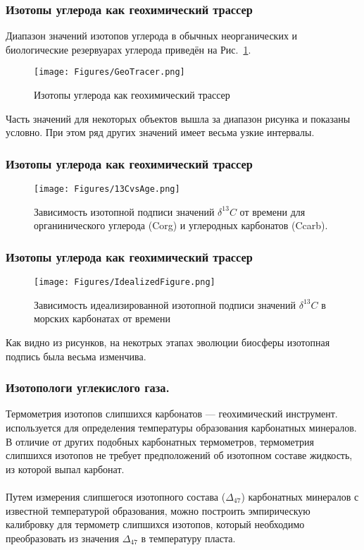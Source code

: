 \begin{frame}
\frametitle{Изотопы углерода как геохимический трассер}


Диапазон значений изотопов углерода в обычных неорганических и
биологические резервуарах углерода приведён на Рис.~\ref{fig:GeoTracer}.
\begin{figure}[h]
	\centering
	\texttt{[image: Figures/GeoTracer.png]}
	\caption{Изотопы углерода как геохимический трассер}
	\label{fig:GeoTracer}
\end{figure}
Часть значений для некоторых объектов вышла за диапазон рисунка и показаны условно. При этом ряд других значений имеет весьма узкие интервалы.

\end{frame}


\begin{frame}
\frametitle{Изотопы углерода как геохимический трассер}

\begin{figure}[h]
	\centering
	\texttt{[image: Figures/13CvsAge.png]}
	\caption{Зависимость изотопной подписи значений $\delta^{13}C$  от времени  для органинического углерода (Corg) и углеродных карбонатов (Ccarb).}
	\label{fig:13CvsAge}
\end{figure}


\end{frame}

\begin{frame}
\frametitle{Изотопы углерода как геохимический трассер}
\begin{figure}[h]
	\centering
	\texttt{[image: Figures/IdealizedFigure.png]}
	\caption{Зависимость идеализированной изотопной подписи значений $\delta^{13}C$ в морских карбонатах от времени}
	\label{fig:IdealizedFigure}
\end{figure}

Как видно из рисунков, на некотрых этапах эволюции биосферы изотопная подпись была весьма изменчива.
\end{frame}

\begin{frame}
\frametitle{Изотопологи углекислого газа.}




Термометрия изотопов слипшихся карбонатов --- геохимический инструмент.
используется для определения температуры образования карбонатных минералов. В отличие от других подобных карбонатных
термометров, термометрия слипшихся изотопов не требует предположений об изотопном составе
жидкость, из которой выпал карбонат. \\
~\\

Путем измерения слипшегося изотопного состава ($\Delta_{47}$)
карбонатных минералов с известной температурой образования, можно построить эмпирическую калибровку для
термометр слипшихся изотопов, который необходимо преобразовать из значения $\Delta_{47}$ в температуру пласта.
\end{frame}

